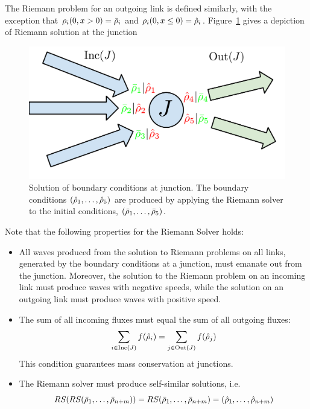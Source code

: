 The Riemann problem for an outgoing link is defined similarly, with
the exception that $\cvar_{\link}\left(0,x>0\right)=\initstate_{\link}$
and $\cvar_{\link}\left(0,x\le0\right)=\trace{\cvar}_{\link}$. Figure~\ref{fig:Solution-of-boundary}
gives a depiction of Riemann solution at the junction%
\begin{figure}
\begin{centering}
\includegraphics[width=0.5\columnwidth]{presentation/figs-gen/junctions-riemann-rs} 
\par\end{centering}

\caption{Solution of boundary conditions at junction. The boundary conditions
$\tuple{\trace{\cvar}_{1}}{\trace{\cvar}_{5}}$ are produced by applying
the Riemann solver to the initial conditions, $\tuple{\initstate_{1}}{\initstate_{5}}$.\label{fig:Solution-of-boundary}}
\end{figure}


Note that the following properties for the Riemann Solver holds:
\begin{itemize}
\item All waves produced from the solution to Riemann problems on all links,
generated by the boundary conditions at a junction, must emanate out
from the junction. Moreover, the solution to the Riemann problem
on an incoming link must produce waves with negative speeds, while
the solution on an outgoing link must produce waves with positive
speed. 
\item The sum of all incoming fluxes must equal the sum of all outgoing
fluxes: 
\[
\sum_{i\in\Inc\left(\jn\right)}f\left(\trace{\cvar}_{\link}\right)=\sum_{j\in\Out\left(\jn\right)}f\left(\trace{\cvar}_{j}\right)
\]
This condition guarantees mass conservation at junctions.
\item The Riemann solver must produce self-similar solutions, i.e. 
\[
\RS\left(\RS\tuple{\initstate_{1}}{\initstate_{\ninc+\nout}}\right)=\RS\tuple{\initstate_{1}}{\initstate_{\ninc+\nout}}=\tuple{\trace{\cvar}_{1}}{\trace{\cvar}_{\ninc+\nout}}
\]
\end{itemize}

